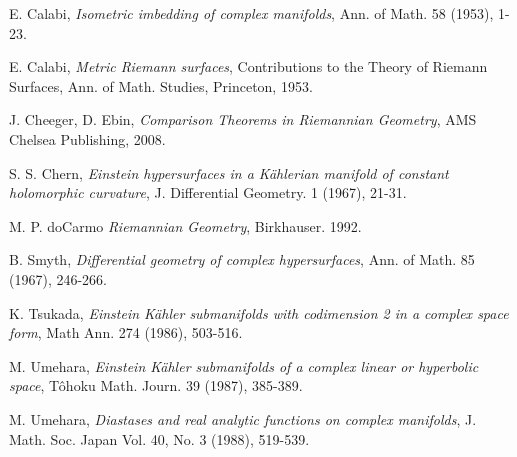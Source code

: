 \documentclass[11pt]{amsart}
\theoremstyle{definition}
\begin{document}
\begin{thebibliography}{-1}

\parskip 4pt

 E. Calabi, {\it Isometric imbedding of complex manifolds},
Ann. of Math. 58 (1953), 1-23.

\smallskip

 E. Calabi, {\it Metric Riemann surfaces},
Contributions to the Theory of Riemann Surfaces, Ann. of Math.
Studies, Princeton, 1953.

\smallskip

 J. Cheeger, D. Ebin, {\it Comparison Theorems in Riemannian Geometry}, AMS Chelsea Publishing, 2008.

\smallskip

 S. S. Chern, {\it Einstein hypersurfaces in a K\"ahlerian manifold of constant
holomorphic curvature}, J. Differential Geometry. 1 (1967), 21-31.

\smallskip

 M. P. doCarmo {\it Riemannian Geometry}, Birkhauser. 1992. 

\smallskip

 B. Smyth, {\it Differential geometry of complex hypersurfaces},
Ann. of Math. 85 (1967), 246-266.

\smallskip

 K. Tsukada, {\it Einstein K\"ahler submanifolds with codimension 2 in a complex space form},
Math Ann. 274 (1986), 503-516.

\smallskip

 M. Umehara, {\it Einstein K\"ahler submanifolds of
a complex linear or hyperbolic space}, T\^{o}hoku Math. Journ. 39
(1987), 385-389.

\smallskip

 M. Umehara, {\it Diastases and real analytic functions on complex
manifolds}, J. Math. Soc. Japan Vol. 40, No. 3 (1988), 519-539.

\end{thebibliography}

\bigskip
\end{document}
